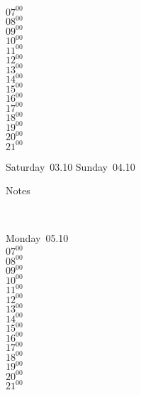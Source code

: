\documentclass[11pt,a4paper]{book}\usepackage[]{graphicx}\usepackage[]{color}
\begin{document}
{{{{{{{{{{{{{\begin{tcolorbox}
{ 
$07^{00}$\\
$08^{00}$\\
$09^{00}$\\
$10^{00}$\\
$11^{00}$\\
$12^{00}$\\
$13^{00}$\\
$14^{00}$\\
$15^{00}$\\
$16^{00}$\\
$17^{00}$\\
$18^{00}$\\
$19^{00}$\\
$20^{00}$\\
$21^{00}$}\\
\end{tcolorbox} 
%
\begin{tcolorbox}[height=(\textheight-10mm)/6]
Saturday~03.10
\tcblower
Sunday~04.10
\end{tcolorbox} %
%
\begin{tcolorbox}[height=(\textheight-10mm)/6,sidebyside=false]
Notes
\end{tcolorbox}
\clearpage
\vspace{2 mm}\\
%
%
\begin{tcolorbox}
Monday~05.10\\
{ 
$07^{00}$\\
$08^{00}$\\
$09^{00}$\\
$10^{00}$\\
$11^{00}$\\
$12^{00}$\\
$13^{00}$\\
$14^{00}$\\
$15^{00}$\\
$16^{00}$\\
$17^{00}$\\
$18^{00}$\\
$19^{00}$\\
$20^{00}$\\
$21^{00}$}\\
\end{tcolorbox}
}}}}}}}}}}}}}
\end{document}
